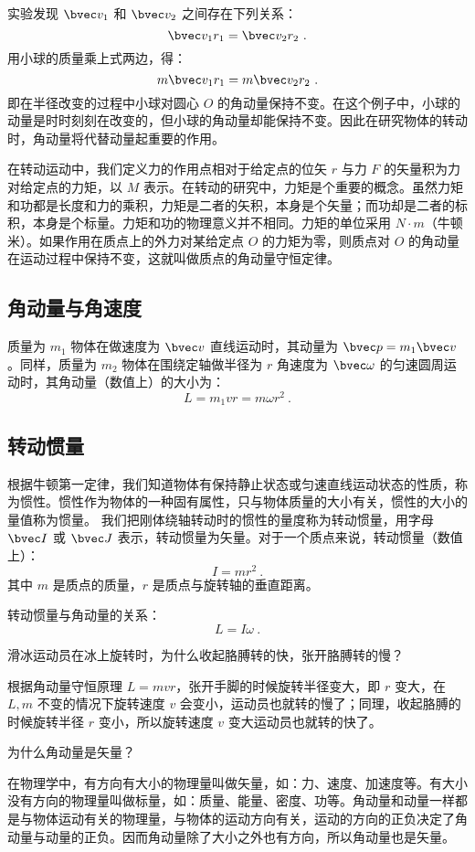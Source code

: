 实验发现 $\bvec v_1$ 和 $\bvec v_2$ 之间存在下列关系：
\begin{equation}
\bvec v_1r_1=\bvec v_2r_2~.
\end{equation}
用小球的质量乘上式两边，得：
\begin{equation}
m\bvec v_1r_1=m\bvec v_2r_2~.
\end{equation}
即在半径改变的过程中小球对圆心 $O$ 的角动量保持不变。在这个例子中，小球的动量是时时刻刻在改变的，但小球的角动量却能保持不变。因此在研究物体的转动时，角动量将代替动量起重要的作用。

在转动运动中，我们定义力的作用点相对于给定点的位矢 $r$ 与力 $F$ 的矢量积为力对给定点的力矩，以 $M$ 表示。在转动的研究中，力矩是个重要的概念。虽然力矩和功都是长度和力的乘积，力矩是二者的矢积，本身是个矢量；而功却是二者的标积，本身是个标量。力矩和功的物理意义并不相同。力矩的单位采用 $N\cdot m$（牛顿米）。如果作用在质点上的外力对某给定点 $O$ 的力矩为零，则质点对 $O$ 的角动量在运动过程中保持不变，这就叫做质点的角动量守恒定律。
\subsection{角动量与角速度}
质量为 $m_1$ 物体在做速度为 $\bvec v$ 直线运动时，其动量为 $\bvec p=m_1\bvec v$。同样，质量为 $m_2$ 物体在围绕定轴做半径为 $r$ 角速度为 $\bvec \omega$ 的匀速圆周运动时，其角动量（数值上）的大小为：
\begin{equation}
L=m_1vr=m\omega r^2~.
\end{equation}
\subsection{转动惯量}
根据牛顿第一定律，我们知道物体有保持静止状态或匀速直线运动状态的性质，称为惯性。惯性作为物体的一种固有属性，只与物体质量的大小有关，惯性的大小的量值称为惯量。
我们把刚体绕轴转动时的惯性的量度称为转动惯量，用字母 $\bvec I$ 或 $\bvec J$ 表示，转动惯量为矢量。对于一个质点来说，转动惯量（数值上）：
\begin{equation}
I=mr^{2}~.
\end{equation}
其中 $m$ 是质点的质量，$r$ 是质点与旋转轴的垂直距离。

转动惯量与角动量的关系：
\begin{equation}
L=I\omega~.
\end{equation}


\begin{example}{}
滑冰运动员在冰上旋转时，为什么收起胳膊转的快，张开胳膊转的慢？

根据角动量守恒原理 $L=mvr$，张开手脚的时候旋转半径变大，即 $r$ 变大，在 $L,m$ 不变的情况下旋转速度 $v$ 会变小，运动员也就转的慢了；同理，收起胳膊的时候旋转半径 $r$ 变小，所以旋转速度 $v$ 变大运动员也就转的快了。
\end{example}
\begin{example}{}
为什么角动量是矢量？

在物理学中，有方向有大小的物理量叫做矢量，如：力、速度、加速度等。有大小没有方向的物理量叫做标量，如：质量、能量、密度、功等。角动量和动量一样都是与物体运动有关的物理量，与物体的运动方向有关，运动的方向的正负决定了角动量与动量的正负。因而角动量除了大小之外也有方向，所以角动量也是矢量。
\end{example}


